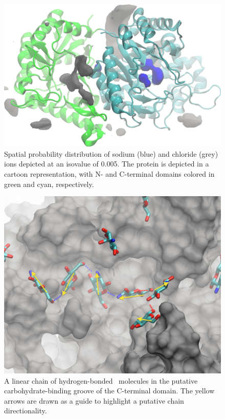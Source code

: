\begin{figure}[htbp]
\centering
\includegraphics[width=6.25in]{figures/results4/pgab_glucosamine_salt_densities.pdf}
\caption[Ionic distribution]{Spatial probability distribution of sodium (blue) and chloride (grey) ions depicted at an isovalue of 0.005. The protein is depicted in a cartoon representation, with N- and C-terminal domains colored in green and cyan, respectively.}
\label{fig:salt_density_distribution}
\end{figure}

\begin{figure}[htbp]
\centering
\includegraphics[width=6.25in]{figures/results4/glucosamine_binding_direction_suggestive.pdf}
\caption[Polymer directionality]{A linear chain of hydrogen-bonded \glucosamine\ molecules in the putative carbohydrate-binding groove of the C-terminal domain. The yellow arrows are drawn as a guide to highlight a putative chain directionality.}
\label{fig:directionality}
\end{figure}

